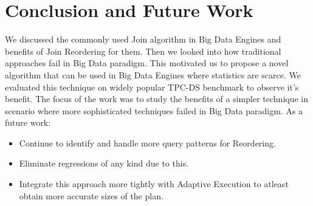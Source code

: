 \section{Conclusion and Future Work}
We discussed the commonly used Join algorithm in Big Data Engines and benefits of Join Reordering for them. Then we looked into how traditional approaches fail in Big Data paradigm. This motivated us to propose a novel algorithm that can be used in Big Data Engines where statistics are scarce. We evaluated this technique on widely popular TPC-DS benchmark to observe it's benefit. The focus of the work was to study the benefits of a simpler technique in scenario where more sophisticated techniques failed in Big Data paradigm. As a future work:

\begin{itemize}
\item Continue to identify and handle more query patterns for Reordering.
\item Eliminate regressions of any kind due to this.
\item Integrate this approach more tightly with Adaptive Execution to atleast obtain more accurate sizes of the plan.
\end{itemize}

